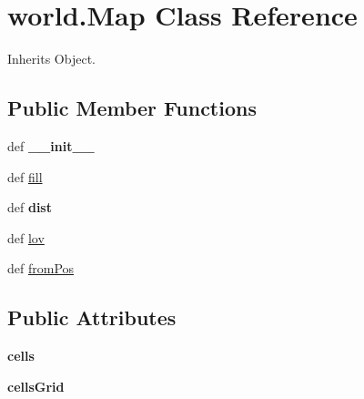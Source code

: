 \hypertarget{classworld_1_1_map}{\section{world.\-Map \-Class \-Reference}
\label{classworld_1_1_map}
}


\-Inherits \-Object.

\subsection*{\-Public \-Member \-Functions}
\begin{DoxyCompactItemize}
\item 
\hypertarget{classworld_1_1_map_aabfde95675f6b82d9a8afcd676053632}{def {\bfseries \-\_\-\-\_\-init\-\_\-\-\_\-}}\label{classworld_1_1_map_aabfde95675f6b82d9a8afcd676053632}

\item 
def \hyperlink{classworld_1_1_map_ac8e650b696f537d9df20ee5d2243e978}{fill}
\item 
\hypertarget{classworld_1_1_map_ac5f255ae58db6b391d0a3d5807365370}{def {\bfseries dist}}\label{classworld_1_1_map_ac5f255ae58db6b391d0a3d5807365370}

\item 
def \hyperlink{classworld_1_1_map_a7b1d3e4419fd5bd48d5f759e63ae55f5}{lov}
\item 
def \hyperlink{classworld_1_1_map_a12e89884cc3e9da4d024575a85b1d324}{from\-Pos}
\end{DoxyCompactItemize}
\subsection*{\-Public \-Attributes}
\begin{DoxyCompactItemize}
\item 
\hypertarget{classworld_1_1_map_af412cfb2a5b25f4ca3188498f916a647}{{\bfseries cells}}\label{classworld_1_1_map_af412cfb2a5b25f4ca3188498f916a647}

\item 
\hypertarget{classworld_1_1_map_aec6e18657e8d65b1ab57cdf305e2de37}{{\bfseries cells\-Grid}}\label{classworld_1_1_map_aec6e18657e8d65b1ab57cdf305e2de37}

\end{DoxyCompactItemize}


